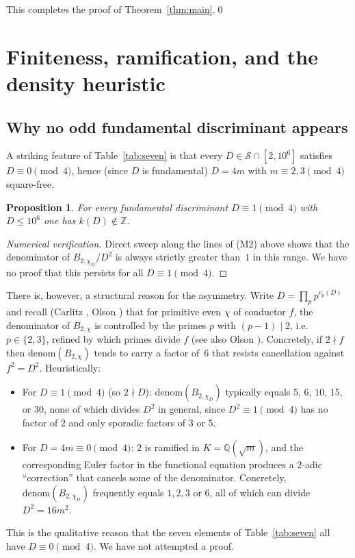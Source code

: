 \documentclass[11pt,reqno]{amsart}
\theoremstyle{plain}
\newtheorem{proposition}[theorem]{Proposition}
\theoremstyle{definition}
\newcommand{\Q}{\mathbb{Q}}
\newcommand{\Z}{\mathbb{Z}}
\begin{document}
This completes the proof of Theorem~\ref{thm:main}.\qed

\section{Finiteness, ramification, and the density heuristic}\label{sec:finiteness}

\subsection{Why no odd fundamental discriminant appears}
A striking feature of Table~\ref{tab:seven} is that every $D\in\mathcal{S}\cap[2,10^{6}]$
satisfies $D\equiv 0\pmod 4$, hence (since $D$ is fundamental) $D=4m$
with $m\equiv 2,3\pmod 4$ square-free.

\begin{proposition}\label{prop:no-odd}
For every fundamental discriminant $D\equiv 1\pmod 4$ with
$D\le 10^{6}$ one has $k(D)\notin\Z$.
\end{proposition}

\begin{proof}[Numerical verification]
Direct sweep along the lines of (M2) above shows that the
denominator of $B_{2,\chi_{D}}/D^{2}$ is always strictly greater than~$1$
in this range.  We have no proof that this persists for all $D\equiv 1\pmod 4$.
\end{proof}

There is, however, a structural reason for the asymmetry.  Write
$D=\prod_{p}p^{v_{p}(D)}$ and recall (Carlitz \cite{Carlitz1959},
Olson \cite{Olson1955}) that for primitive even $\chi$ of conductor
$f$, the denominator of $B_{2,\chi}$ is controlled by the primes $p$
with $(p-1)\mid 2$, i.e.\ $p\in\{2,3\}$, refined by which primes
divide $f$ (see also Olson \cite{Olson1955}).  Concretely, if $2\nmid f$ then $\mathrm{denom}(B_{2,\chi})$ tends
to carry a factor of~$6$ that resists cancellation against
$f^{2}=D^{2}$.  Heuristically:
\begin{itemize}
\item For $D\equiv 1\pmod 4$ (so $2\nmid D$): $\mathrm{denom}(B_{2,\chi_{D}})$
typically equals $5$, $6$, $10$, $15$, or $30$, none of which divides
$D^{2}$ in general, since $D^{2}\equiv 1\pmod 4$ has no factor of $2$
and only sporadic factors of $3$ or $5$.
\item For $D=4m\equiv 0\pmod 4$: $2$ is ramified in $K=\Q(\sqrt{m})$, and
the corresponding Euler factor in the functional equation produces a
$2$-adic ``correction'' that cancels some of the denominator.
Concretely, $\mathrm{denom}(B_{2,\chi_{D}})$ frequently equals $1,2,3$ or
$6$, all of which can divide $D^{2}=16m^{2}$.
\end{itemize}
This is the qualitative reason that the seven elements of
Table~\ref{tab:seven} all have $D\equiv 0\pmod 4$.  We have not
attempted a proof.
\end{document}
